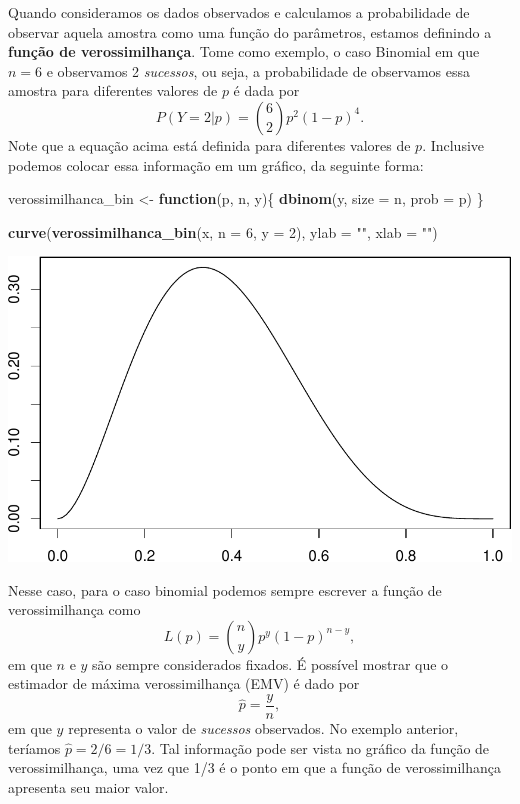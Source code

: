 \documentclass[]{book}
\newenvironment{Shaded}{\begin{snugshade}}{\end{snugshade}}
\newcommand{\ControlFlowTok}[1]{\textcolor[rgb]{0.13,0.29,0.53}{\textbf{#1}}}
\newcommand{\DataTypeTok}[1]{\textcolor[rgb]{0.13,0.29,0.53}{#1}}
\newcommand{\DecValTok}[1]{\textcolor[rgb]{0.00,0.00,0.81}{#1}}
\newcommand{\KeywordTok}[1]{\textcolor[rgb]{0.13,0.29,0.53}{\textbf{#1}}}
\newcommand{\NormalTok}[1]{#1}
\newcommand{\StringTok}[1]{\textcolor[rgb]{0.31,0.60,0.02}{#1}}
\begin{document}
Quando consideramos os dados observados e calculamos a probabilidade de observar aquela amostra como uma função do parâmetros, estamos definindo a \textbf{função de verossimilhança}. Tome como exemplo, o caso Binomial em que \(n = 6\) e observamos 2 \emph{sucessos}, ou seja, a probabilidade de observamos essa amostra para diferentes valores de \(p\) é dada por
\[
P(Y = 2|p) = {6 \choose 2} p^2 (1-p)^4.
\]
Note que a equação acima está definida para diferentes valores de \(p\). Inclusive podemos colocar essa informação em um gráfico, da seguinte forma:

\begin{Shaded}
\begin{Highlighting}[]
\NormalTok{verossimilhanca_bin <-}\StringTok{ }\ControlFlowTok{function}\NormalTok{(p, n, y)\{}
  \KeywordTok{dbinom}\NormalTok{(y, }\DataTypeTok{size =}\NormalTok{ n, }\DataTypeTok{prob =}\NormalTok{ p) }
\NormalTok{\}}

\KeywordTok{curve}\NormalTok{(}\KeywordTok{verossimilhanca_bin}\NormalTok{(x, }\DataTypeTok{n =} \DecValTok{6}\NormalTok{, }\DataTypeTok{y =} \DecValTok{2}\NormalTok{), }
      \DataTypeTok{ylab =} \StringTok{""}\NormalTok{, }\DataTypeTok{xlab =} \StringTok{""}\NormalTok{)}
\end{Highlighting}
\end{Shaded}

\begin{center}\includegraphics[width=0.8\linewidth]{notas_livro_files/figure-latex/vero_bin-1} \end{center}

Nesse caso, para o caso binomial podemos sempre escrever a função de verossimilhança como
\[
L(p) = {n \choose y} p^y (1-p)^{n-y},
\]
em que \(n\) e \(y\) são sempre considerados fixados. É possível mostrar que o estimador de máxima verossimilhança (EMV) é dado por
\[
\hat{p} = \frac{y}{n},
\]
em que \(y\) representa o valor de \emph{sucessos} observados. No exemplo anterior, teríamos \(\hat{p} = 2/6 = 1/3\). Tal informação pode ser vista no gráfico da função de verossimilhança, uma vez que 1/3 é o ponto em que a função de verossimilhança apresenta seu maior valor.
\end{document}
